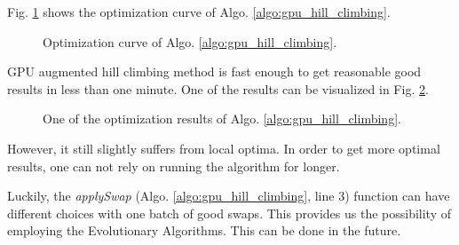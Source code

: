 Fig. \ref{fig:gpu_hill_climbing} shows the optimization curve of Algo. \ref{algo:gpu_hill_climbing}.

\begin{figure}
    \centering
    \fbox{\rule[-.5cm]{4cm}{4cm} \rule[-.5cm]{4cm}{0cm}}
    \caption{Optimization curve of Algo. \ref{algo:gpu_hill_climbing}.}
    \label{fig:gpu_hill_climbing}
\end{figure}

GPU augmented hill climbing method is fast enough to get reasonable good results in less than one minute.
One of the results can be visualized in Fig. \ref{fig:optimization_results}.

\begin{figure}
    \centering
    \fbox{\rule[-.5cm]{4cm}{4cm} \rule[-.5cm]{4cm}{0cm}}
    \caption{One of the optimization results of Algo. \ref{algo:gpu_hill_climbing}.}
    \label{fig:optimization_results}
\end{figure}

However, it still slightly suffers from local optima.
In order to get more optimal results, one can not rely on running the algorithm for longer.

Luckily, the \emph{applySwap} (Algo. \ref{algo:gpu_hill_climbing}, line 3) function can have different choices with one batch of good swaps.
This provides us the possibility of employing the Evolutionary Algorithms.
This can be done in the future.

